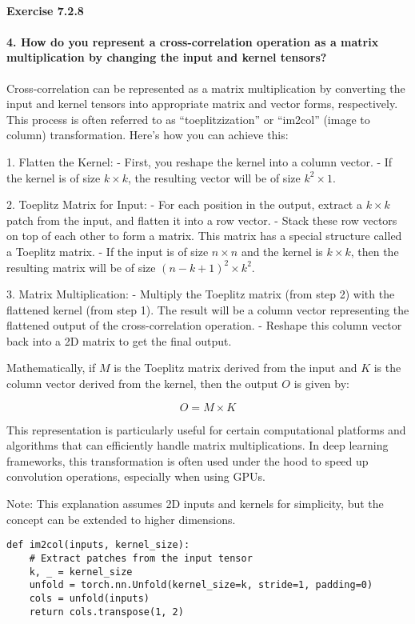 \paragraph{Exercise 7.2.8}

\paragraph{4. How do you represent a cross-correlation operation as a matrix multiplication by changing the input and kernel tensors?}

Cross-correlation can be represented as a matrix multiplication by converting the input and kernel tensors into appropriate matrix and vector forms, respectively.
This process is often referred to as ``toeplitzization'' or ``im2col'' (image to column) transformation. Here's how you can achieve this:

1. Flatten the Kernel:
- First, you reshape the kernel into a column vector.
- If the kernel is of size \( k \times k \), the resulting vector will be of size \( k^2 \times 1 \).

2. Toeplitz Matrix for Input:
- For each position in the output, extract a \( k \times k \) patch from the input, and flatten it into a row vector.
- Stack these row vectors on top of each other to form a matrix. This matrix has a special structure called a Toeplitz matrix.
- If the input is of size \( n \times n \) and the kernel is \( k \times k \), then the resulting matrix will be of size \( \left(n-k+1\right)^2   \times k^2 \).

3. Matrix Multiplication:
- Multiply the Toeplitz matrix (from step 2) with the flattened kernel (from step 1). The result will be a column vector representing the flattened output of the cross-correlation operation.
- Reshape this column vector back into a 2D matrix to get the final output.

Mathematically, if \( M \) is the Toeplitz matrix derived from the input and \( K \) is the column vector derived from the kernel, then the output \( O \) is given by:

\[ O = M \times K \]

This representation is particularly useful for certain computational platforms and algorithms that can efficiently handle matrix multiplications.
In deep learning frameworks, this transformation is often used under the hood to speed up convolution operations, especially when using GPUs.

Note: This explanation assumes 2D inputs and kernels for simplicity, but the concept can be extended to higher dimensions.

\begin{verbatim}
def im2col(inputs, kernel_size):
    # Extract patches from the input tensor
    k, _ = kernel_size
    unfold = torch.nn.Unfold(kernel_size=k, stride=1, padding=0)
    cols = unfold(inputs)
    return cols.transpose(1, 2)
\end{verbatim}

